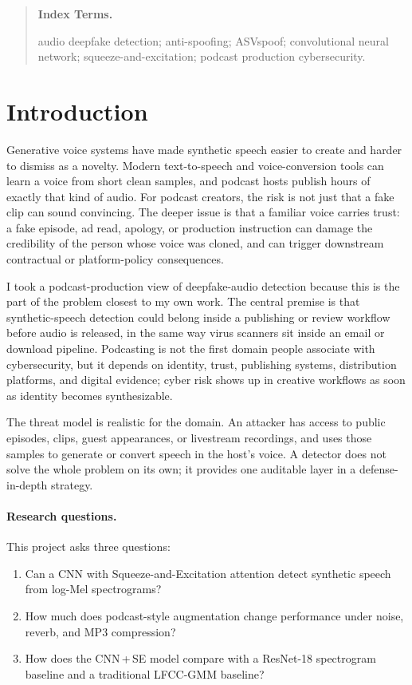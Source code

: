 \documentclass[11pt, letterpaper]{article}
\newenvironment{keywords}{%
  \vspace{-0.6em}
  \begin{quote}\small\noindent
  \textbf{\color{accentink}Index Terms.} \ignorespaces
}{%
  \end{quote}\vspace{0.4em}
}
\begin{document}
\begin{keywords}
audio deepfake detection; anti-spoofing; ASVspoof; convolutional neural network; squeeze-and-excitation; podcast production cybersecurity.
\end{keywords}

\section{Introduction}\label{sec:intro}

Generative voice systems have made synthetic speech easier to create and harder to dismiss as a novelty. Modern text-to-speech and voice-conversion tools can learn a voice from short clean samples, and podcast hosts publish hours of exactly that kind of audio. For podcast creators, the risk is not just that a fake clip can sound convincing. The deeper issue is that a familiar voice carries trust: a fake episode, ad read, apology, or production instruction can damage the credibility of the person whose voice was cloned, and can trigger downstream contractual or platform-policy consequences.

I took a podcast-production view of deepfake-audio detection because this is the part of the problem closest to my own work. The central premise is that synthetic-speech detection could belong inside a publishing or review workflow before audio is released, in the same way virus scanners sit inside an email or download pipeline. Podcasting is not the first domain people associate with cybersecurity, but it depends on identity, trust, publishing systems, distribution platforms, and digital evidence; cyber risk shows up in creative workflows as soon as identity becomes synthesizable.

The threat model is realistic for the domain. An attacker has access to public episodes, clips, guest appearances, or livestream recordings, and uses those samples to generate or convert speech in the host's voice. A detector does not solve the whole problem on its own; it provides one auditable layer in a defense-in-depth strategy.

\paragraph{Research questions.}
This project asks three questions:
\begin{enumerate}
    \item Can a CNN with Squeeze-and-Excitation attention detect synthetic speech from log-Mel spectrograms?
    \item How much does podcast-style augmentation change performance under noise, reverb, and MP3 compression?
    \item How does the CNN\,+\,SE model compare with a ResNet-18 spectrogram baseline and a traditional LFCC-GMM baseline?
\end{enumerate}
\end{document}
